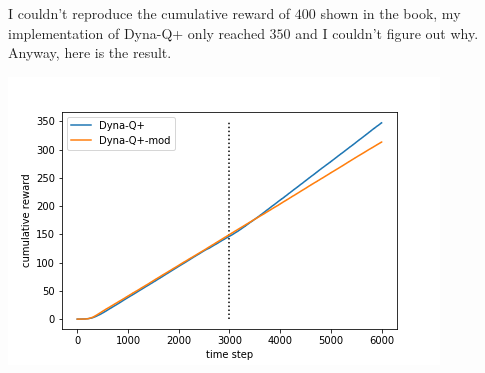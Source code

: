 \documentclass[12pt,a4paper]{article}
\begin{document}
\begin{enumerate}
    I couldn't reproduce the cumulative reward of $400$ shown in the book, my
    implementation of Dyna-Q+ only reached $350$ and I couldn't figure out why.
    Anyway, here is the result.

    \begin{center}
    \includegraphics[scale=0.7]{dyna}
    \end{center}


\end{enumerate}
\end{document}
